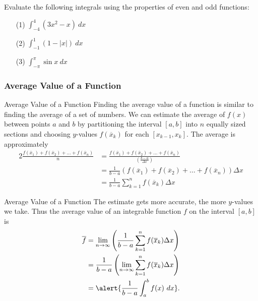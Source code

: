 \documentclass[cal1spr16Lectures.tex]{subfiles}
\begin{document}
\begin{frame}%
\begin{exe}Evaluate the following integrals using the properties of even and odd functions:

\begin{itemize}

\vspace{0.25pc}
\item[(1)] $\int_{-4}^4 (3x^2-x)\ dx$

\vspace{0.5pc}
\item[(2)] $\int_{-1}^1 (1-|x|)\ dx$

\vspace{0.5pc}
\item [(3)] $\int_{-\pi}^{\pi} \sin x \ dx$
\end{itemize}
\end{exe}
\end{frame}

\subsubsection{Average Value of a Function}

\begin{frame}{\small Average Value of a Function}\footnotesize
Finding the average value of a function is similar to finding the average of a set of numbers.  We can estimate the average of $f(x)$ between points $a$ and $b$ by partitioning the interval $[a,b]$ into $n$ equally sized sections and choosing $y$-values $f(\overline{x}_k)$ for each $[x_{k-1},x_k]$.  The average is approximately  
\begin{alignat*}{2}
\frac{f(\overline{x}_1) + f(\overline{x}_2) + \dots + f(\overline{x}_n)}{n} &= 
\frac{f(\overline{x}_1) + f(\overline{x}_2) + \dots + f(\overline{x}_n)}{\left(\frac{b-a}{\Delta x}\right)} \\
&= \frac{1}{b-a} \left(f(\overline{x}_1) + f(\overline{x}_2) + \dots + f(\overline{x}_n) \right) \Delta x \\
 &= \frac{1}{b-a}\sum_{k=1}^nf(\overline{x}_k)\Delta x
\end{alignat*}
\end{frame}

\begin{frame}{\small Average Value of a Function}\footnotesize
The estimate gets more accurate, the more $y$-values we take.  Thus the average value of an integrable function $f$ on the interval $[a,b]$ is 
\begin{align*}
\overline{f} &= \lim_{n\to \infty}\left(\frac{1}{b-a}\sum_{k=1}^nf(\overline{x}_k)\Delta x\right) \\
	&= \frac{1}{b-a}\left(\lim_{n\to\infty}\sum_{k=1}^nf(\overline{x}_k)\Delta x\right) \\
	&= \alert{\frac{1}{b-a} \int_a^b f(x)\ dx}.
\end{align*}
\end{frame}
\end{document}
